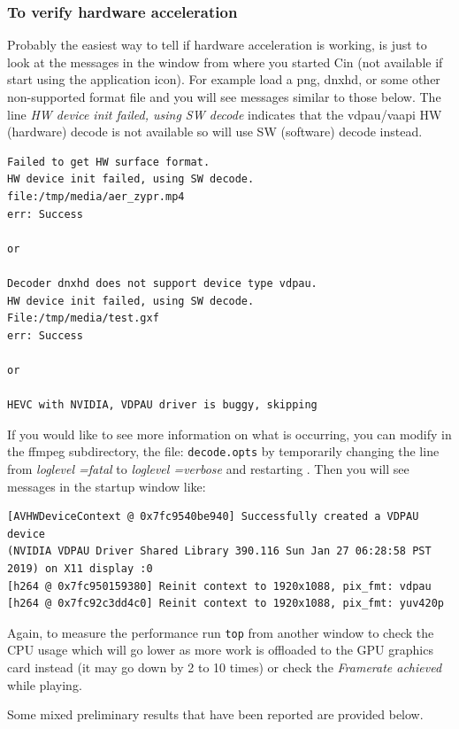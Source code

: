 \subsubsection*{To verify hardware acceleration}%
\label{ssub:verify_hardware_acceleration}

Probably the easiest way to tell if hardware acceleration is working, is just to look at the messages in the window from where you started Cin (not available if start using the application icon).  For example load a png, dnxhd, or some other non-supported format file and you will see messages similar to those below.  The line \textit{HW device init failed, using SW decode} indicates that the vdpau/vaapi HW (hardware) decode is not available so will use SW (software) decode instead.

\begin{lstlisting}[numbers=none]
Failed to get HW surface format.
HW device init failed, using SW decode.
file:/tmp/media/aer_zypr.mp4
err: Success

or

Decoder dnxhd does not support device type vdpau.
HW device init failed, using SW decode.
File:/tmp/media/test.gxf
err: Success

or

HEVC with NVIDIA, VDPAU driver is buggy, skipping
\end{lstlisting}

If you would like to see more information on what is occurring, you can modify in the \CGG{} ffmpeg subdirectory, the file:  \texttt{decode.opts}   by temporarily changing the line from \textit{loglevel =fatal} to \textit{loglevel =verbose} and restarting \CGG{}.  Then you will see messages in the startup window like:

\begin{lstlisting}[numbers=none]
[AVHWDeviceContext @ 0x7fc9540be940] Successfully created a VDPAU device 
(NVIDIA VDPAU Driver Shared Library 390.116 Sun Jan 27 06:28:58 PST 2019) on X11 display :0
[h264 @ 0x7fc950159380] Reinit context to 1920x1088, pix_fmt: vdpau
[h264 @ 0x7fc92c3dd4c0] Reinit context to 1920x1088, pix_fmt: yuv420p
\end{lstlisting}

Again, to measure the performance run \texttt{top} from another window to check the CPU usage which will go lower as more work is offloaded to the GPU graphics card instead (it may go down by 2 to 10 times) or check the \textit{Framerate achieved} while playing.

Some mixed preliminary results that have been reported are provided below.

